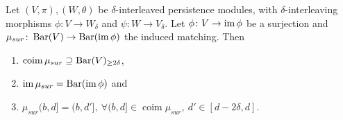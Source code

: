 \begin{lemma} \label{lemma:sur-image}
    Let $ (V, \pi), (W, \theta) $ be $\delta$-interleaved persistence modules, with $\delta$-inter\-leaving morphisms $ \phi\colon V \to W_\delta $ and $ \psi\colon W \to V_\delta $. Let $ \phi\colon V \to \operatorname{im}\phi $ be a surjection and $ \mu_{sur}\colon \operatorname{Bar}(V) \to \operatorname{Bar} (\operatorname{im} \phi)$ the induced matching. Then
    \begin{enumerate}
        \item $\operatorname{coim} \mu_{sur} \supseteq \operatorname{Bar} (V)_{\geq 2\delta} $,
        \item $ \operatorname{im} \mu_{sur} = \operatorname{Bar} (\operatorname{im} \phi)$ and \label{}
        \item $ \mu_{sur}(b, d] = (b, d'], \ \forall (b, d] \in \operatorname{coim} \mu_{sur}, \ d' \in [d-2\delta, d]$.
    \end{enumerate}
\end{lemma}
